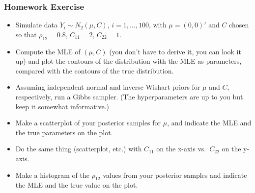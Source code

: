 \documentclass[handout]{beamer}
\begin{document}



\begin{frame}
\frametitle{Homework Exercise}
\begin{itemize}[<+-| alert@+>]
\item Simulate data $Y_i \sim N_2( \mu, C)$, $i=1,\ldots,100$, with $\mu=(0,0)'$ and
    $C$ chosen so that $\rho_{12}=0.8$, $C_{11}=2$, $C_{22}=1$.

\item Compute the MLE of $(\mu,C)$ (you don't have to derive it, you can look it up) and plot the contours of the distribution with the
    MLE as parameters, compared with the contours of the true distribution.

\item Assuming independent normal and inverse Wishart priors for $\mu$ and $C$, respectively, run a 
Gibbs sampler. (The hyperparameters are up to you but keep it somewhat informative.)

\item Make a scatterplot of your posterior samples for $\mu$, and indicate the MLE and the true parameters on the plot.
\item Do the same thing (scatterplot, etc.) with $C_{11}$ on the x-axis vs.\ $C_{22}$ on the y-axis.
\item Make a histogram of the $\rho_{12}$ values from your posterior samples and indicate the MLE and the true value on the plot.
\end{itemize}
\end{frame}


 
\end{document}
